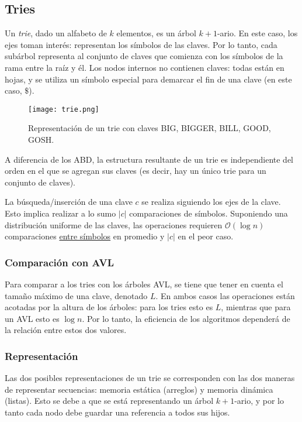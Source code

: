 \documentclass{article}
\newcommand{\BigO}[1]{{\mathcal{O}(#1)}}
\begin{document}
\subsection{Tries}

Un \textit{trie}, dado un alfabeto de $k$ elementos, es un árbol ${k+1}$-ario. En este caso, los ejes toman interés: representan los símbolos de las claves. Por lo tanto, cada subárbol representa al conjunto de claves que comienza con los símbolos de la rama entre la raíz y él. Los nodos internos no contienen claves: todas están en hojas, y se utiliza un símbolo especial para demarcar el fin de una clave (en este caso, $\$$).

    \label{fig-trie}
    \begin{figure}[H]
        \centering
        \texttt{[image: trie.png]}
        \caption*{Representación de un trie con claves BIG, BIGGER, BILL, GOOD, GOSH.}
    \end{figure}

    A diferencia de los ABD, la estructura resultante de un trie es independiente del orden en el que se agregan sus claves (es decir, hay un único trie para un conjunto de claves).

    La búsqueda/inserción de una clave $c$ se realiza siguiendo los ejes de la clave. Esto implica realizar a lo sumo $|c|$ comparaciones de símbolos. Suponiendo una distribución uniforme de las claves, las operaciones requieren $\BigO{\log{n}}$ comparaciones \underline{entre símbolos} en promedio y $|c|$ en el peor caso.

    \subsubsection{Comparación con AVL}

    Para comparar a los tries con los árboles AVL, se tiene que tener en cuenta el tamaño máximo de una clave, denotado $L$. En ambos casos las operaciones están acotadas por la altura de los árboles: para los tries esto es $L$, mientras que para un AVL esto es $\log{n}$. Por lo tanto, la eficiencia de los algoritmos dependerá de la relación entre estos dos valores.

    \subsubsection{Representación}

    Las dos posibles representaciones de un trie se corresponden con las dos maneras de representar secuencias: memoria estática (arreglos) y memoria dinámica (listas). Esto se debe a que se está representando un árbol ${k+1}$-ario, y por lo tanto cada nodo debe guardar una referencia a todos sus hijos.
\end{document}
